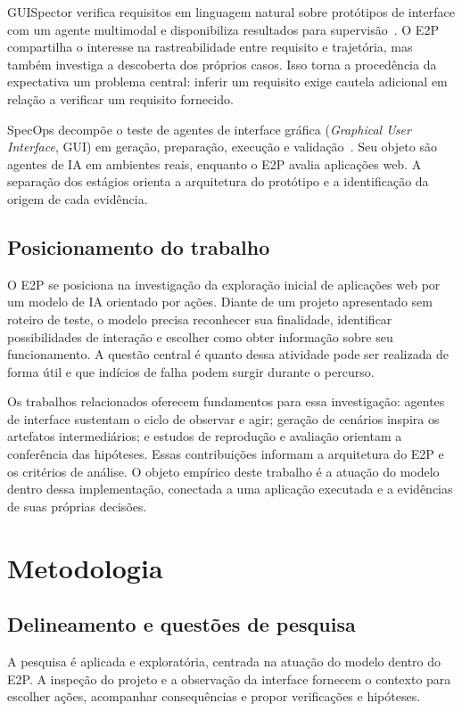 \documentclass[12pt]{article}
\begin{document}
GUISpector verifica requisitos em linguagem natural sobre protótipos de interface com um agente multimodal e disponibiliza resultados para supervisão~\cite{kolthoff2025guispector}. O E2P compartilha o interesse na rastreabilidade entre requisito e trajetória, mas também investiga a descoberta dos próprios casos. Isso torna a procedência da expectativa um problema central: inferir um requisito exige cautela adicional em relação a verificar um requisito fornecido.

SpecOps decompõe o teste de agentes de interface gráfica (\textit{Graphical User Interface}, GUI) em geração, preparação, execução e validação~\cite{ahmed2026specops}. Seu objeto são agentes de IA em ambientes reais, enquanto o E2P avalia aplicações web. A separação dos estágios orienta a arquitetura do protótipo e a identificação da origem de cada evidência.

\subsection{Posicionamento do trabalho}
O E2P se posiciona na investigação da exploração inicial de aplicações web por um modelo de IA orientado por ações. Diante de um projeto apresentado sem roteiro de teste, o modelo precisa reconhecer sua finalidade, identificar possibilidades de interação e escolher como obter informação sobre seu funcionamento. A questão central é quanto dessa atividade pode ser realizada de forma útil e que indícios de falha podem surgir durante o percurso.

Os trabalhos relacionados oferecem fundamentos para essa investigação: agentes de interface sustentam o ciclo de observar e agir; geração de cenários inspira os artefatos intermediários; e estudos de reprodução e avaliação orientam a conferência das hipóteses. Essas contribuições informam a arquitetura do E2P e os critérios de análise. O objeto empírico deste trabalho é a atuação do modelo dentro dessa implementação, conectada a uma aplicação executada e a evidências de suas próprias decisões.

\section{Metodologia}\label{sec:method}
\subsection{Delineamento e questões de pesquisa}
A pesquisa é aplicada e exploratória, centrada na atuação do modelo dentro do E2P. A inspeção do projeto e a observação da interface fornecem o contexto para escolher ações, acompanhar consequências e propor verificações e hipóteses.
\end{document}
